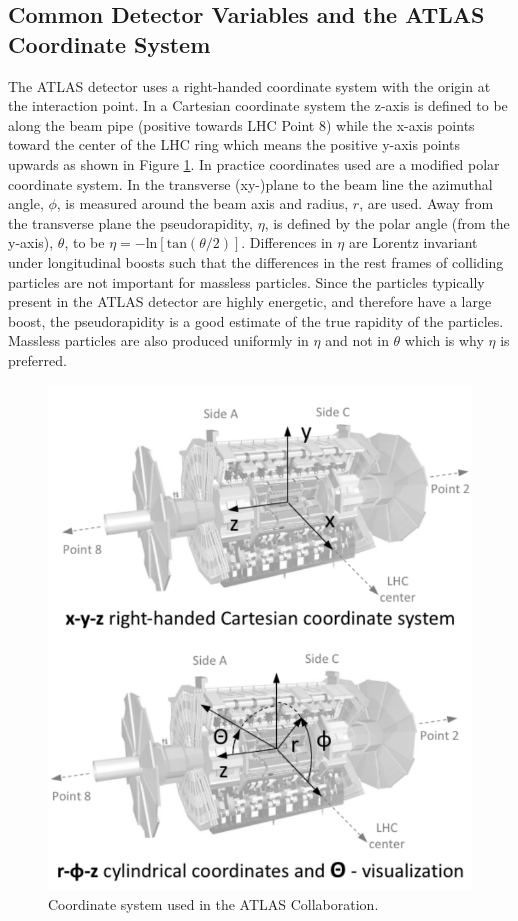 \subsection{Common Detector Variables and the ATLAS Coordinate System}
The ATLAS detector uses a right-handed coordinate system with the origin at the interaction point.  In a Cartesian coordinate system the z-axis is defined to be along the beam pipe (positive towards LHC Point 8) while the x-axis points toward the center of the LHC ring which means the positive y-axis points upwards as shown in Figure \ref{fig:ATLASCoords}.  In practice coordinates used are a modified polar coordinate system.  In the transverse (xy-)plane to the beam line the azimuthal angle, $\phi$, is measured around the beam axis and radius, $r$, are used.  Away from the transverse plane the pseudorapidity, $\eta$, is defined by the polar angle (from the y-axis), $\theta$, to be $\eta= -\text{ln}[\text{tan}(\theta/2)]$.  Differences in $\eta$ are Lorentz invariant under longitudinal boosts such that the differences in the rest frames of colliding particles are not important for massless particles.  Since the particles typically present in the ATLAS detector are highly energetic, and therefore have a large boost, the pseudorapidity is a good estimate of the true rapidity of the particles.  Massless particles are also produced uniformly in $\eta$ and not in $\theta$  which is why $\eta$ is preferred.

\begin{figure}[h!]
	\centering
	\includegraphics[width=0.5\columnwidth]{../ThesisImages/LHCImages/ATLASCoords.png}
	\caption[Coordinate system used in the ATLAS Collaboration.]{Coordinate system used in the ATLAS Collaboration.\cite{ATLASCoords}
	}
	\label{fig:ATLASCoords}
\end{figure}

